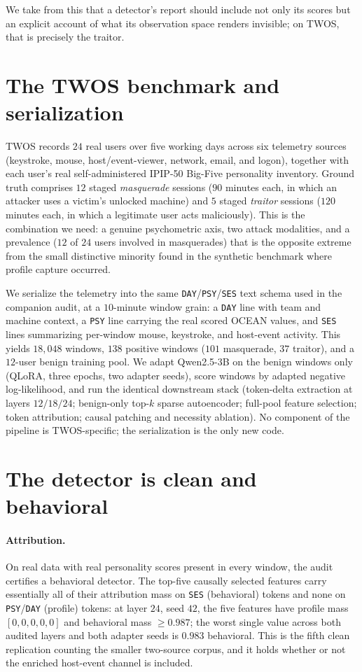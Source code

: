 \documentclass[10pt]{article}
\begin{document}
We take from this that a detector's report should include not only its scores
but an explicit account of what its observation space renders invisible; on
TWOS, that is precisely the traitor.

\section{The TWOS benchmark and serialization}

TWOS \citep{harilal2017twos} records $24$ real users over five working days
across six telemetry sources (keystroke, mouse, host/event-viewer, network,
email, and logon), together with each user's real self-administered IPIP-50
Big-Five personality inventory. Ground truth comprises $12$ staged
\emph{masquerade} sessions ($90$ minutes each, in which an attacker uses a
victim's unlocked machine) and $5$ staged \emph{traitor} sessions ($120$
minutes each, in which a legitimate user acts maliciously). This is the
combination we need: a genuine psychometric axis, two attack modalities, and a
prevalence ($12$ of $24$ users involved in masquerades) that is the opposite
extreme from the small distinctive minority found in the synthetic benchmark
where profile capture occurred.

We serialize the telemetry into the same \texttt{DAY}/\texttt{PSY}/\texttt{SES}
text schema used in the companion audit, at a $10$-minute window grain: a
\texttt{DAY} line with team and machine context, a \texttt{PSY} line carrying
the real scored OCEAN values, and \texttt{SES} lines summarizing per-window
mouse, keystroke, and host-event activity. This yields $18{,}048$ windows,
$138$ positive windows ($101$ masquerade, $37$ traitor), and a $12$-user benign
training pool. We adapt Qwen2.5-3B on the benign windows only (QLoRA, three
epochs, two adapter seeds), score windows by adapted negative log-likelihood,
and run the identical downstream stack (token-delta extraction at layers
$12/18/24$; benign-only top-$k$ sparse autoencoder; full-pool feature
selection; token attribution; causal patching and necessity ablation). No
component of the pipeline is TWOS-specific; the serialization is the only new
code.

\section{The detector is clean and behavioral}

\paragraph{Attribution.} On real data with real personality scores present in
every window, the audit certifies a behavioral detector. The top-five causally
selected features carry essentially all of their attribution mass on
\texttt{SES} (behavioral) tokens and none on \texttt{PSY}/\texttt{DAY}
(profile) tokens: at layer $24$, seed $42$, the five features have profile mass
$[0,0,0,0,0]$ and behavioral mass $\ge 0.987$; the worst single value across
both audited layers and both adapter seeds is $0.983$ behavioral. This is the
fifth clean replication counting the smaller two-source corpus, and it holds
whether or not the enriched host-event channel is included.
\end{document}
